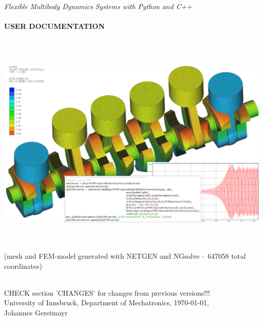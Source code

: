 \documentclass[11pt,a4paper]{book} %
\begin{document}
\setcounter{page}{0}
\pagestyle{empty}

\begin{center}
{\Large {\it Flexible Multibody Dynamics Systems with Python and C++}}\vspace{1cm}\\
{\Huge {\bf \codeName}} \vspace{0.5cm}\\
{\Large \bf USER DOCUMENTATION} \vspace{1cm}\\
\vspace{0.2cm}
\begin{center}
	\includegraphics[height=11cm]{intro2.png}\\
	{\tiny (mesh and FEM-model generated with NETGEN and NGsolve -- 647058 total coordinates)}
\end{center}
\vspace{0.2cm}
{\small }\\
{\small CHECK section 'CHANGES' for changes from previous versions!!!\\}
\vspace{1.5cm}
University of Innsbruck, Department of Mechatronics, \today,\vspace{0.25cm}\\
Johannes Gerstmayr\vspace{2cm}
\end{center}
\end{document}
